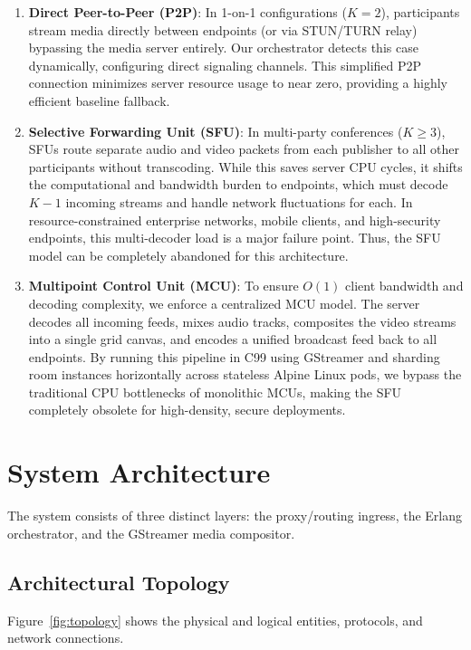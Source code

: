 \documentclass{article}
\begin{document}
\begin{enumerate}
    \item \textbf{Direct Peer-to-Peer (P2P)}: In 1-on-1 configurations ($K=2$), participants stream
          media directly between endpoints (or via STUN/TURN relay) bypassing the media server
          entirely. Our orchestrator detects this case dynamically, configuring direct signaling
          channels. This simplified P2P connection minimizes server resource usage to near zero,
          providing a highly efficient baseline fallback.
    \item \textbf{Selective Forwarding Unit (SFU)}: In multi-party conferences ($K \ge 3$), SFUs
          route separate audio and video packets from each publisher to all other participants
          without transcoding. While this saves server CPU cycles, it shifts the computational
          and bandwidth burden to endpoints, which must decode $K-1$ incoming streams and handle
          network fluctuations for each. In resource-constrained enterprise networks, mobile
          clients, and high-security endpoints, this multi-decoder load is a major failure point.
          Thus, the SFU model can be completely abandoned for this architecture.
    \item \textbf{Multipoint Control Unit (MCU)}: To ensure $O(1)$ client bandwidth and decoding
          complexity, we enforce a centralized MCU model. The server decodes all incoming feeds,
          mixes audio tracks, composites the video streams into a single grid canvas, and encodes
          a unified broadcast feed back to all endpoints. By running this pipeline in C99 using
          GStreamer and sharding room instances horizontally across stateless Alpine Linux pods,
          we bypass the traditional CPU bottlenecks of monolithic MCUs, making the SFU completely
          obsolete for high-density, secure deployments.
\end{enumerate}

\newpage
\section{System Architecture}

The system consists of three distinct layers: the proxy/routing ingress, the Erlang orchestrator,
and the GStreamer media compositor.

\subsection{Architectural Topology}
Figure~\ref{fig:topology} shows the physical and logical entities, protocols, and network connections.
\end{document}
